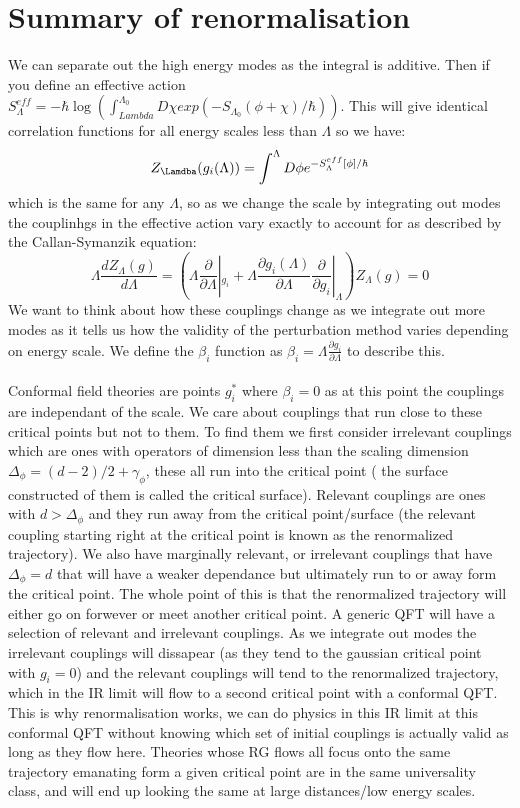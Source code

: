 \documentclass{article}
\begin{document}
\section{Summary of renormalisation}
We can separate out the high energy modes as the integral is additive. Then if you define an effective action $S_{\Lambda}^{eff} = - \hbar \log ( \int_{Lambda}^{\Lambda_0} D \chi exp( - S_{\Lambda_0} (\phi + \chi)/\hbar))$. This will give identical correlation functions for all energy scales less than $\Lambda$ so we have:
$$
 Z_{\Lamdba}( g_i (\Lambda)) = \int^{\Lambda} D \phi e^{ - S^{eff}_{\Lambda}[\phi]/\hbar}
$$
which is the same for any $\Lambda$, so as we change the scale by integrating out modes the couplinhgs in the effective action vary exactly to account for as described by the Callan-Symanzik equation:
$$
 \Lambda \frac{d Z_{\Lambda}(g)}{d\Lambda} = ( \Lambda \frac{\partial}{\partial \Lambda}|_{g_i} + \Lambda \frac{\partial g_i ( \Lambda)}{\partial \Lambda} \frac{\partial}{\partial g_i}|_{\Lambda}) Z_{\Lambda}(g) = 0
$$
We want to think about how these couplings change as we integrate out more modes as it tells us how the validity of the perturbation method varies depending on energy scale. We define the $\beta_i$ function as $\beta_i = \Lambda \frac{\partial g_i}{\partial \Lambda}$ to describe this.\\\\
Conformal field theories are points $g^*_i$ where $\beta_i = 0$ as at this point the couplings are independant of the scale. We care about couplings that run close to these critical points but not to them. To find them we first consider irrelevant couplings which are ones with operators of dimension less than the scaling dimension $\Delta_{\phi} = (d-2) /2 + \gamma_{\phi}$, these all run into the critical point ( the surface constructed of them is called the critical surface). Relevant couplings are ones with $d > \Delta_{\phi}$ and they run away from the critical point/surface (the relevant coupling starting right at the critical point is known as the renormalized trajectory). We also have marginally relevant, or irrelevant couplings that have $\Delta_{\phi} = d$ that will have a weaker dependance but ultimately run to or away form the critical point. The whole point of this is that the renormalized trajectory will either go on forwever or meet another critical point. A generic QFT will have a selection of relevant and irrelevant couplings. As we integrate out modes the irrelevant couplings will dissapear (as they tend to the gaussian critical point with $g_i = 0$) and the relevant couplings will tend to the renormalized trajectory, which in the IR limit will flow to a second critical point with a conformal QFT. This is why renormalisation works, we can do physics in this IR limit at this conformal QFT without knowing which set of initial couplings is actually valid as long as they flow here. Theories whose RG flows all focus onto the same trajectory emanating form a given critical point are in the same universality class, and will end up looking the same at large distances/low energy scales.\\\\
\end{document}
